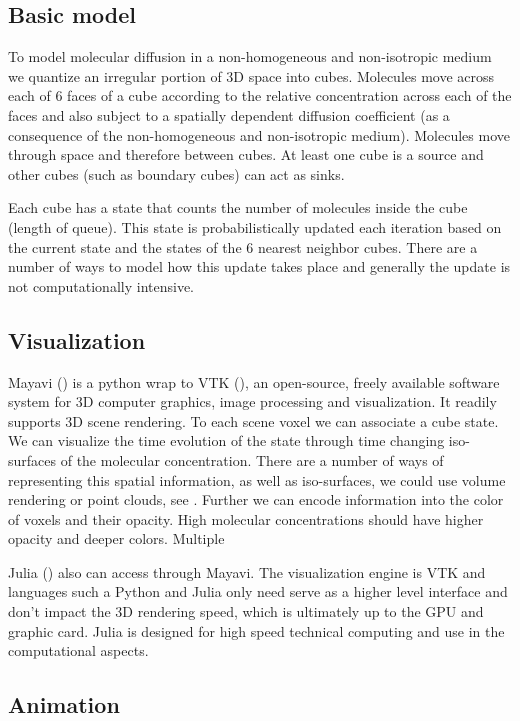 \documentclass[10pt, twocolumn, twoside]{IEEEtran}
\begin{document}
\subsection{Basic model}

To model molecular diffusion in a non-homogeneous and non-isotropic medium we quantize an irregular portion of 3D space into cubes.  Molecules move across each of 6 faces of a cube according to the relative concentration across each of the faces and also subject to a spatially dependent diffusion coefficient (as a consequence of the non-homogeneous and non-isotropic medium).  Molecules move through space and therefore between cubes. At least one cube is a source and other cubes (such as boundary cubes) can act as sinks.

Each cube has a state that counts the number of molecules inside the cube (length of queue).  This state is probabilistically updated each iteration based on the current state and the states of the 6 nearest neighbor cubes.  There are a number of ways to model how this update takes place and generally the update is not computationally intensive.

\subsection{Visualization}

Mayavi () is a python wrap to VTK (), an open-source, freely available software system for 3D computer graphics, image processing and visualization.  It readily supports 3D scene rendering.  To each scene voxel we can associate a cube state.  We can visualize the time evolution of the state through time changing iso-surfaces of the molecular concentration.  There are a number of ways of representing this spatial information, as well as iso-surfaces, we could use volume rendering or point clouds, see .  Further we can encode information into the color of voxels and their opacity.  High molecular concentrations should have higher opacity and deeper colors.  Multiple

Julia () also can access through Mayavi.  The visualization engine is VTK and languages such a Python and Julia only need serve as a higher level interface and don't impact the 3D rendering speed, which is ultimately up to the GPU and graphic card.  Julia is designed for high speed technical computing and use in the computational aspects.

\subsection{Animation}





%
\end{document}

